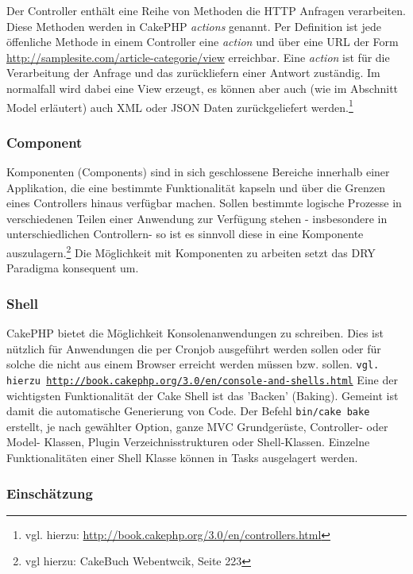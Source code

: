 	Der Controller enthält eine Reihe von  Methoden die HTTP Anfragen verarbeiten. Diese Methoden werden in CakePHP \textit{actions} genannt. Per Definition ist jede öffenliche Methode in einem Controller eine \textit{action} und über eine URL der Form \url{http://samplesite.com/article-categorie/view} erreichbar.
	Eine \textit{action} ist für die Verarbeitung der Anfrage und das zurückliefern einer Antwort zuständig. Im normalfall wird dabei eine View erzeugt, es können aber auch (wie im Abschnitt Model erläutert) auch XML oder JSON Daten zurückgeliefert werden.\footnote{vgl. hierzu: \url{http://book.cakephp.org/3.0/en/controllers.html}}
	
	\subsubsection{Component}
	Komponenten (Components) sind in sich geschlossene Bereiche innerhalb einer Applikation, die eine bestimmte Funktionalität kapseln und über die Grenzen eines Controllers hinaus verfügbar machen. Sollen bestimmte logische Prozesse in verschiedenen Teilen einer Anwendung zur Verfügung stehen - insbesondere in unterschiedlichen Controllern- so ist es sinnvoll diese in eine Komponente auszulagern.\footnote{vgl hierzu: CakeBuch Webentwcik, Seite 223}
	Die Möglichkeit mit Komponenten zu arbeiten setzt das DRY Paradigma konsequent um.
	
	\subsubsection{Shell}	
	CakePHP bietet die Möglichkeit Konsolenanwendungen zu schreiben. Dies ist nützlich für Anwendungen die per Cronjob ausgeführt werden sollen oder für solche die nicht aus einem Browser erreicht werden müssen bzw. sollen. \texttt{vgl. hierzu \url{http://book.cakephp.org/3.0/en/console-and-shells.html}}
	Eine der wichtigsten Funktionalität der Cake Shell ist das 'Backen' (Baking). Gemeint ist damit die automatische Generierung von Code. Der Befehl \texttt{bin/cake bake} erstellt, je nach gewählter Option, ganze MVC Grundgerüste, Controller- oder Model- Klassen, Plugin Verzeichnisstrukturen oder Shell-Klassen. Einzelne Funktionalitäten einer Shell Klasse können in Tasks ausgelagert werden.  
	
	\subsubsection{Einschätzung}
	
